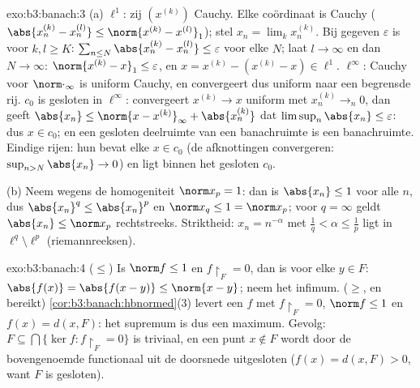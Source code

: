 \begin{solution}{exo:b3:banach:3}
(a) $\ell^1$: zij $(x^{(k)})$ Cauchy. Elke coördinaat is Cauchy
($\abs{x^{(k)}_n - x^{(l)}_n} \leq \norm{x^{(k)} - x^{(l)}}_1$);
stel $x_n = \lim_kx^{(k)}_n$. Bij gegeven $\varepsilon$ is voor
$k, l \geq K$: $\sum_{n \leq N}\abs{x^{(k)}_n - x^{(l)}_n} \leq
\varepsilon$ voor elke $N$; laat $l \to \infty$ en dan $N \to
\infty$: $\norm{x^{(k)} - x}_1 \leq \varepsilon$, en $x = x^{(k)}
- (x^{(k)} - x) \in \ell^1$. $\ell^\infty$: Cauchy voor
$\norm\cdot_\infty$ is uniform Cauchy, en convergeert dus uniform
naar een begrensde rij. $c_0$ is gesloten in $\ell^\infty$:
convergeert $x^{(k)} \to x$ uniform met $x^{(k)}_n \to_n 0$, dan
geeft $\abs{x_n} \leq \norm{x - x^{(k)}}_\infty +
\abs{x^{(k)}_n}$ dat $\limsup_n\abs{x_n} \leq \varepsilon$: dus
$x \in c_0$; en een gesloten deelruimte van een banachruimte is
een banachruimte. Eindige rijen: hun  bevat elke $x \in
c_0$ (de afknottingen convergeren: $\sup_{n>N}\abs{x_n} \to 0$)
en ligt binnen het gesloten $c_0$.

(b) Neem wegens de homogeniteit $\norm x_p = 1$: dan is
$\abs{x_n} \leq 1$ voor alle $n$, dus $\abs{x_n}^q \leq
\abs{x_n}^p$ en $\norm x_q \leq 1 = \norm x_p$; voor $q = \infty$
geldt $\abs{x_n} \leq \norm x_p$ rechtstreeks. Striktheid: $x_n =
n^{-\alpha}$ met $\frac1q < \alpha \leq \frac1p$ ligt in $\ell^q
\setminus \ell^p$ (riemannreeksen).
\end{solution}

\begin{solution}{exo:b3:banach:4}
($\leq$) Is $\norm f \leq 1$ en $f\restriction_F = 0$, dan is voor
elke $y \in F$: $\abs{f(x)} = \abs{f(x - y)} \leq \norm{x - y}$;
neem het infimum. ($\geq$, en bereikt)
\cref{cor:b3:banach:hbnormed}(3) levert een $f$ met
$f\restriction_F = 0$, $\norm f \leq 1$ en $f(x) = d(x, F)$: het
supremum is dus een maximum. Gevolg: $F \subseteq \bigcap\{\ker f
: f\restriction_F = 0\}$ is triviaal, en een punt $x \notin F$
wordt door de bovengenoemde functionaal uit de doorsnede
uitgesloten ($f(x) = d(x,F) > 0$, want $F$ is gesloten).
\end{solution}

